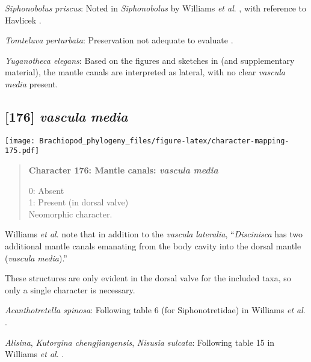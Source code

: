 \documentclass[openany]{book}
\theoremstyle{definition}
\theoremstyle{definition}
\theoremstyle{definition}
\theoremstyle{remark}
\begin{document}
\hypertarget{Siphonobolus_priscus-coding-175}{}
\emph{Siphonobolus priscus}: Noted in \emph{Siphonobolus} by Williams
\emph{et al}. \citeyearpar{Williams2000LinguliformeaCraniiformea}, with
reference to Havlicek \citeyearpar{Havlicek1982LingulaceaPaterinacea}.

\hypertarget{Tomteluva_perturbata-coding-175}{}
\emph{Tomteluva perturbata}: Preservation not adequate to evaluate
\citep{Streng2016Anew}.

\hypertarget{Yuganotheca_elegans-coding-175}{}
\emph{Yuganotheca elegans}: Based on the figures and sketches in
\citet{Zhang2014Anearly} (and supplementary material), the mantle canals
are interpreted as lateral, with no clear \emph{vascula} \emph{media}
present.

\subsection*{\texorpdfstring{{[}176{]} \emph{vascula}
\emph{media}}{{[}176{]} vascula media}}\label{vascula-media}

\texttt{[image: Brachiopod\_phylogeny\_files/figure-latex/character-mapping-175.pdf]}

\begin{quote}
\textbf{Character 176: Mantle canals: \emph{vascula} \emph{media}}

0: Absent\\
1: Present (in dorsal valve)\\
Neomorphic character.
\end{quote}

Williams \emph{et al}. \citeyearpar{Williams1997Introduction} note that
in addition to the \emph{vascula} \emph{lateralia}, ``\emph{Discinisca}
has two additional mantle canals emanating from the body cavity into the
dorsal mantle (\emph{vascula} \emph{media}).''

These structures are only evident in the dorsal valve for the included
taxa, so only a single character is necessary.

\hypertarget{Acanthotretella_spinosa-coding-176}{}
\emph{Acanthotretella spinosa}: Following table 6 (for Siphonotretidae)
in Williams \emph{et al}.
\citeyearpar{Williams2000LinguliformeaCraniiformea}.

\hypertarget{Alisina-coding-176}{}
\emph{Alisina}, \emph{Kutorgina chengjiangensis}, \emph{Nisusia
sulcata}: Following table 15 in Williams \emph{et al}.
\citeyearpar{Williams2000LinguliformeaCraniiformea}.
\end{document}
